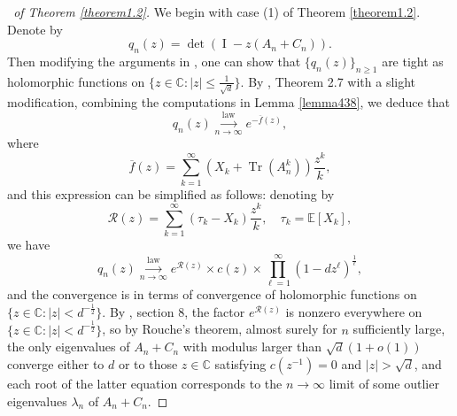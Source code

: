 \documentclass[12pt, reqno]{amsart}
\theoremstyle{definition}
\theoremstyle{remark}
\numberwithin{equation}{section}
\begin{document}
\begin{proof}[\proofname\ of Theorem \ref{theorem1.2}]
We begin with case (1) of Theorem \ref{theorem1.2}.
    Denote by $$q_n(z)=\det(\operatorname{I}-z(A_n+C_n)).$$ Then modifying the arguments in \cite{coste2023sparse}, one can show that $\{q_n(z)\}_{n\geq 1}$ are tight as holomorphic functions on $\{z\in\mathbb{C}:|z|\leq\frac{1}{\sqrt{d}}\}$. By \cite{coste2023sparse}, Theorem 2.7 with a slight modification, combining the computations in Lemma \ref{lemma438}, we deduce that
    \begin{equation}
        q_n(z)\overset{\text{law}}{\underset{n\to\infty}{\longrightarrow}}e^{-\overline{f}(z)},
    \end{equation}
    where 
    $$
\overline{f}(z)=\sum_{k=1}^\infty (X_k+\operatorname{Tr}(A_n^k))\frac{z^k}{k},
    $$
    and this expression can be simplified as follows: denoting by
    $$
\mathscr{R}(z)=\sum_{k=1}^\infty (\tau_k-X_k)\frac{z^k}{k},\quad \tau_k=\mathbb{E}[X_k],
    $$
    we have 
    \begin{equation}
         q_n(z)\overset{\text{law}}{\underset{n\to\infty}{\longrightarrow}}e^{\mathscr{R}(z)}\times c(z)\times \prod_{\ell=1}^\infty (1-dz^\ell)^\frac{1}{\ell},
    \end{equation}
    and the convergence is in terms of convergence of holomorphic functions on $\{z\in\mathbb{C}:|z|<d^{-\frac{1}{2}}\}$. By \cite{coste2023sparse}, section 8, the factor $e^{\mathscr{R}(z)}$ is nonzero everywhere on $\{z\in\mathbb{C}:|z|<d^{-\frac{1}{2}}\}$, so by Rouche's theorem, almost surely for $n$ sufficiently large, the only eigenvalues of $A_n+C_n$ with modulus larger than $\sqrt{d}(1+o(1))$ converge either to $d$ or to those $z\in\mathbb{C}$ satisfying $c(z^{-1})=0$ and $|z|>\sqrt{d}$, and each root of the latter equation corresponds to the $n\to\infty$ limit of some outlier eigenvalues $\lambda_n$ of  $A_n+C_n$.


\end{proof}
\end{document}
